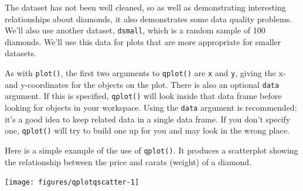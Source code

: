 The dataset has not been well cleaned, so as well as demonstrating
interesting relationships about diamonds, it also demonstrates some data
quality problems. We'll also use another dataset, \texttt{dsmall}, which
is a random sample of 100 diamonds. We'll use this data for plots that
are more appropriate for smaller datasets.

\begin{Shaded}
\begin{Highlighting}[]
\NormalTok{>}\StringTok{ }\NormalTok{(}\NormalTok{) }
\NormalTok{>}\StringTok{ }\StringTok{ }\NormalTok{diamonds[}\NormalTok{(}\NormalTok{), ]}
\end{Highlighting}
\end{Shaded}


As with \texttt{plot()}, the first two arguments to \texttt{qplot()} are
\texttt{x} and \texttt{y}, giving the x- and y-coordinates for the
objects on the plot. There is also an optional \texttt{data} argument.
If this is specified, \texttt{qplot()} will look inside that data frame
before looking for objects in your workspace. Using the \texttt{data}
argument is recommended: it's a good idea to keep related data in a
single data frame. If you don't specify one, \texttt{qplot()} will try
to build one up for you and may look in the wrong place.
 

Here is a simple example of the use of \texttt{qplot()}. It produces a
scatterplot showing the relationship between the price and carats
(weight) of a diamond. 

\begin{Shaded}
\begin{Highlighting}[]
\NormalTok{>}\StringTok{ } 
\end{Highlighting}
\end{Shaded}

\begin{flushleft}\texttt{[image: figures/qplotqscatter-1]} \end{flushleft}

